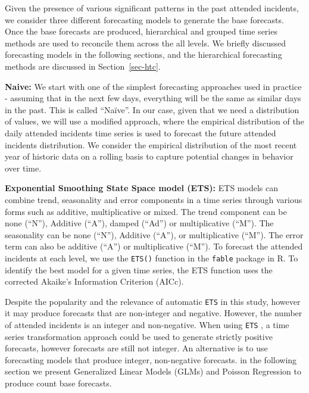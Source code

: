 \documentclass[
  authoryear,
  preprint,
  3p]{elsarticle}
\begin{document}
Given the presence of various significant patterns in the past attended
incidents, we consider three different forecasting models to generate
the base forecasts. Once the base forecasts are produced, hierarchical
and grouped time series methods are used to reconcile them across the
all levels. We briefly discussed forecasting models in the following
sections, and the hierarchical forecasting methods are discussed in
Section~\ref{sec-htc}.

\textbf{Naive:} We start with one of the simplest forecasting approaches
used in practice - assuming that in the next few days, everything will
be the same as similar days in the past. This is called ``Naïve''. In
our case, given that we need a distribution of values, we will use a
modified approach, where the empirical distribution of the daily
attended incidents time series is used to forecast the future attended
incidents distribution. We consider the empirical distribution of the
most recent year of historic data on a rolling basis to capture
potential changes in behavior over time.

\textbf{Exponential Smoothing State Space model (ETS):} ETS models
\citep{hyndman2021forecasting} can combine trend, seasonality and error
components in a time series through various forms such as additive,
multiplicative or mixed. The trend component can be none (``N''),
Additive (``A''), damped (``Ad'') or multiplicative (``M''). The
seasonality can be none (``N''), Additive (``A''), or multiplicative
(``M''). The error term can also be additive (``A'') or multiplicative
(``M''). To forecast the attended incidents at each level, we use the
\texttt{ETS()} function in the \texttt{fable} package \citep{fable2022}
in R. To identify the best model for a given time series, the ETS
function uses the corrected Akaike's Information Criterion (AICc).

Despite the popularity and the relevance of automatic \texttt{ETS} in
this study, however it may produce forecasts that are non-integer and
negative. However, the number of attended incidents is an integer and
non-negative. When using \texttt{ETS} , a time series transformation
approach could be used to generate strictly positive forecasts, however
forecasts are still not integer. An alternative is to use forecasting
models that produce integer, non-negative forecasts. in the following
section we present Generalized Linear Models (GLMs) and Poisson
Regression to produce count base forecasts.
\end{document}
